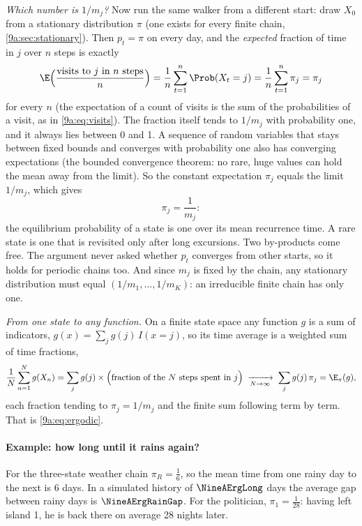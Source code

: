 \emph{Which number is $1/m_j$?} Now run the same walker from a different start: draw $X_0$
from a stationary distribution $\pi$ (one exists for every finite chain,
\cref{9a:sec:stationary}). Then $p_t=\pi$ on every day, and the \emph{expected} fraction of time
in $j$ over $n$ steps is exactly
\begin{equation*}
  \E\Bigl(\frac{\text{visits to }j\text{ in }n\text{ steps}}{n}\Bigr)=\frac1n\sum_{t=1}^n\Prob(X_t=j)
  =\frac1n\sum_{t=1}^n\pi_j=\pi_j
\end{equation*}
for every $n$ (the expectation of a count of visits is the sum of the probabilities of a
visit, as in \eqref{9a:eq:visits}). The fraction itself tends to $1/m_j$ with probability one,
and it always lies between 0 and 1. A sequence of random variables that stays between fixed
bounds and converges with probability one also has converging expectations (the bounded
convergence theorem: no rare, huge values can hold the mean away from the limit). So the
constant expectation $\pi_j$ equals the limit $1/m_j$, which gives 
\begin{equation}
  \pi_j=\frac{1}{m_j}:
  \label{9a:eq:kac}
\end{equation}
the equilibrium probability of a state is one over its mean recurrence time. A rare state is one
that is revisited only after long excursions. Two by-products come free. The argument never
asked whether $p_t$ converges from other starts, so it holds for periodic chains too. And since
$m_j$ is fixed by the chain, any stationary distribution must equal $(1/m_1,\dots,1/m_K)$:
an irreducible finite chain has only one.

\emph{From one state to any function.} On a finite state space any function $g$ is a sum of
indicators, $g(x)=\sum_jg(j)\,I(x=j)$, so its time average is a weighted sum of time fractions,
\begin{equation*}
  \frac1N\sum_{n=1}^Ng(X_n)=\sum_jg(j)\times\Bigl(\text{fraction of the }N\text{ steps spent in }j\Bigr)
  \;\xrightarrow[N\to\infty]{}\;\sum_jg(j)\,\pi_j=\E_\pi(g),
\end{equation*}
each fraction tending to $\pi_j=1/m_j$ and the finite sum following term by term. That is
\eqref{9a:eq:ergodic}.

\paragraph{Example: how long until it rains again?}
For the three-state weather chain $\pi_R=\tfrac16$, so the mean time from one rainy day to the
next is 6 days. In a simulated history of $\NineAErgLong$ days the average gap between rainy days
is $\NineAErgRainGap$. For the politician, $\pi_1=\tfrac1{28}$: having left island 1, he is back
there on average 28 nights later.

